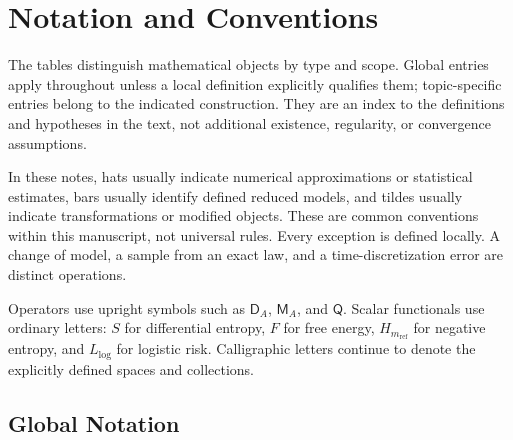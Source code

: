 \chapter*{Notation and Conventions}
\label{ch:notation}
The tables distinguish mathematical objects by type and scope. Global entries apply throughout unless a local definition explicitly qualifies them; topic-specific entries belong to the indicated construction. They are an index to the definitions and hypotheses in the text, not additional existence, regularity, or convergence assumptions.

In these notes, hats usually indicate numerical approximations or statistical estimates, bars usually identify defined reduced models, and tildes usually indicate transformations or modified objects. These are common conventions within this manuscript, not universal rules. Every exception is defined locally. A change of model, a sample from an exact law, and a time-discretization error are distinct operations.

Operators use upright symbols such as $\mathsf D_A$, $\mathsf M_A$, and $\mathsf Q$.
Scalar functionals use ordinary letters: $S$ for differential entropy, $F$ for free energy,
$H_{m_{\mathrm{ref}}}$ for negative entropy, and $L_{\mathrm{log}}$ for logistic risk.
Calligraphic letters continue to denote the explicitly defined spaces and collections.

\section*{Global Notation}
